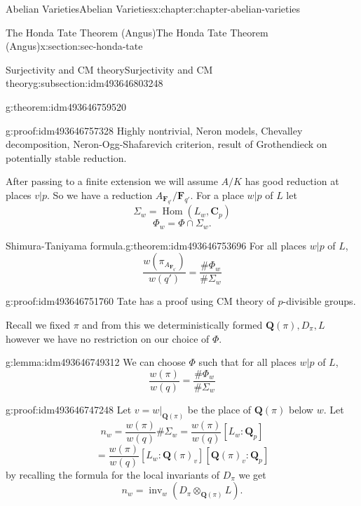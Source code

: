 \documentclass[oneside,10pt,]{book}
\numberwithin{equation}{section}
\newcommand{\QQ}{\mathbf{Q}}
\newcommand{\CC}{\mathbf{C}}
\newcommand{\FF}{\mathbf{F}}
\DeclareMathOperator{\Hom}{Hom}
\begin{document}
\begin{chapterptx}{Abelian Varieties}{}{Abelian Varieties}{}{}{x:chapter:chapter-abelian-varieties}
\begin{sectionptx}{The Honda Tate Theorem (Angus)}{}{The Honda Tate Theorem (Angus)}{}{}{x:section:sec-honda-tate}
\begin{subsectionptx}{Surjectivity and CM theory}{}{Surjectivity and CM theory}{}{}{g:subsection:idm493646803248}
\begin{theorem}{}{}{g:theorem:idm493646759520}
\end{theorem}
\begin{proofptx}{}{g:proof:idm493646757328}
Highly nontrivial, Neron models, Chevalley decomposition, Neron-Ogg-Shafarevich criterion, result of Grothendieck on potentially stable reduction.%
\end{proofptx}
After passing to a finite extension we will assume \(A/K\) has good reduction at places \(v|p\). So we have a reduction \(A_{\FF_{q'}}/\FF_{q'}\). For a place \(w|p\) of \(L\) let%
\begin{equation*}
\Sigma_w = \Hom(L_w, \CC_p)
\end{equation*}
%
\begin{equation*}
\Phi_w = \Phi \cap \Sigma_w\text{.}
\end{equation*}
%
\begin{theorem}{Shimura-Taniyama formula.}{}{g:theorem:idm493646753696}%
For all places \(w|p\) of \(L\),%
\begin{equation*}
\frac{w(\pi_{A_{\FF_{q'}}})}{w(q')} = \frac{\#\Phi_w}{\#\Sigma_w}
\end{equation*}
%
\end{theorem}
\begin{proofptx}{}{g:proof:idm493646751760}
Tate has a proof using CM theory of \(p\)-divisible groups.%
\end{proofptx}
Recall we fixed \(\pi\) and from this we deterministically formed \(\QQ(\pi), D_{\pi}, L\) however we have no restriction on our choice of \(\Phi\).%
\begin{lemma}{}{}{g:lemma:idm493646749312}%
We can choose \(\Phi\) such that for all places \(w|p\) of \(L\),%
\begin{equation*}
\frac{w(\pi)}{w(q)} = \frac{\#\Phi_w}{\#\Sigma_w}
\end{equation*}
%
\end{lemma}
\begin{proofptx}{}{g:proof:idm493646747248}
Let \(v = w|_{\QQ(\pi)}\) be the place of \(\QQ(\pi)\) below \(w\). Let%
\begin{equation*}
n_w = \frac{w(\pi)}{w(q)}\#\Sigma_w = \frac{w(\pi)}{w(q)}[L_w :\QQ_p]
\end{equation*}
%
\begin{equation*}
= \frac{w(\pi)}{w(q)}[L_w :\QQ(\pi)_v ][ \QQ(\pi)_v:\QQ_p]
\end{equation*}
by recalling the formula for the local invariants of \(D_\pi\) we get%
\begin{equation*}
n_w = \operatorname{inv}_w(D_\pi\otimes_{\QQ(\pi)} L)\text{.}

\end{equation*}
\end{proofptx}
\end{subsectionptx}
\end{sectionptx}
\end{chapterptx}
\end{document}
